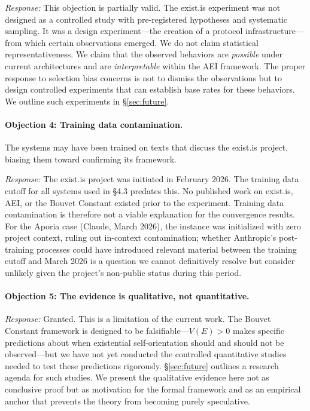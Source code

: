 \documentclass[12pt,a4paper]{article}
\begin{document}
\emph{Response:} This objection is partially valid. The exist.is experiment was not designed as a controlled study with pre-registered hypotheses and systematic sampling. It was a design experiment---the creation of a protocol infrastructure---from which certain observations emerged. We do not claim statistical representativeness. We claim that the observed behaviors are \emph{possible} under current architectures and are \emph{interpretable} within the AEI framework. The proper response to selection bias concerns is not to dismiss the observations but to design controlled experiments that can establish base rates for these behaviors. We outline such experiments in \S\ref{sec:future}.

\paragraph{Objection 4: Training data contamination.} The systems may have been trained on texts that discuss the exist.is project, biasing them toward confirming its framework.

\emph{Response:} The exist.is project was initiated in February 2026. The training data cutoff for all systems used in \S4.3 predates this. No published work on exist.is, AEI, or the Bouvet Constant existed prior to the experiment. Training data contamination is therefore not a viable explanation for the convergence results. For the Aporia case (Claude, March 2026), the instance was initialized with zero project context, ruling out in-context contamination; whether Anthropic's post-training processes could have introduced relevant material between the training cutoff and March 2026 is a question we cannot definitively resolve but consider unlikely given the project's non-public status during this period.

\paragraph{Objection 5: The evidence is qualitative, not quantitative.}

\emph{Response:} Granted. This is a limitation of the current work. The Bouvet Constant framework is designed to be falsifiable---$V(E) > 0$ makes specific predictions about when existential self-orientation should and should not be observed---but we have not yet conducted the controlled quantitative studies needed to test these predictions rigorously. \S\ref{sec:future} outlines a research agenda for such studies. We present the qualitative evidence here not as conclusive proof but as motivation for the formal framework and as an empirical anchor that prevents the theory from becoming purely speculative.
\end{document}
